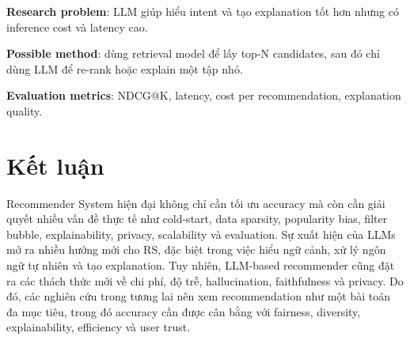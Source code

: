 \documentclass[12pt,a4paper]{article}
\begin{document}
\textbf{Research problem}: LLM giúp hiểu intent và tạo explanation tốt hơn nhưng có inference cost và latency cao.

\textbf{Possible method}: dùng retrieval model để lấy top-N candidates, sau đó chỉ dùng LLM để re-rank hoặc explain một tập nhỏ.

\textbf{Evaluation metrics}: NDCG@K, latency, cost per recommendation, explanation quality.

\section{Kết luận}

Recommender System hiện đại không chỉ cần tối ưu accuracy mà còn cần giải quyết nhiều vấn đề thực tế như cold-start, data sparsity, popularity bias, filter bubble, explainability, privacy, scalability và evaluation. 
Sự xuất hiện của LLMs mở ra nhiều hướng mới cho RS, đặc biệt trong việc hiểu ngữ cảnh, xử lý ngôn ngữ tự nhiên và tạo explanation. 
Tuy nhiên, LLM-based recommender cũng đặt ra các thách thức mới về chi phí, độ trễ, hallucination, faithfulness và privacy. 
Do đó, các nghiên cứu trong tương lai nên xem recommendation như một bài toán đa mục tiêu, trong đó accuracy cần được cân bằng với fairness, diversity, explainability, efficiency và user trust.
\end{document}

